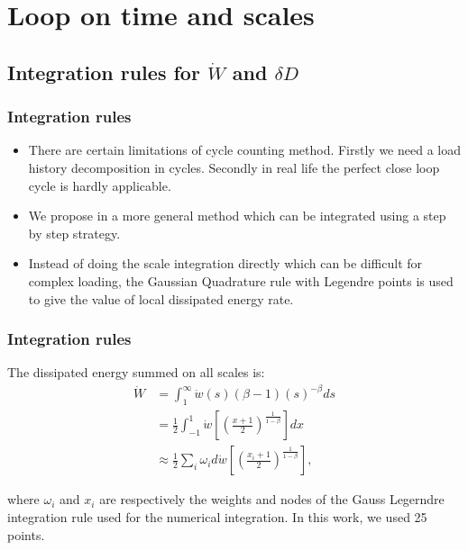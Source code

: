\documentclass[xcolor=table]{Bredelebeamer}
\begin{document}
\section{Loop on time and scales}
\subsection{Integration rules for $\dot{W}$ and $\delta D$}

\begin{frame}
\frametitle{Integration rules}
	\begin{block}{}	
\begin{itemize}
\item There are certain limitations of cycle counting method. Firstly we need a load history decomposition in cycles. Secondly in real life the perfect close loop cycle is hardly applicable.
					
\vspace{6pt}
\item We propose in a more general method which can be integrated using a step by step strategy. 
					
\vspace{6pt}
\item Instead of doing the scale integration directly which can be difficult for complex loading, the Gaussian Quadrature rule with Legendre points is used to give the value of local dissipated energy rate.
\end{itemize}	
\end{block}
\end{frame}	

\begin{frame}
	\frametitle{Integration rules}
The dissipated energy summed on all scales is:
\begin{equation}
	\begin{split}
		\dot{W}&=\int_{1}^{\infty}\dot{w}(s) (\beta-1)(s)^{-\beta}ds
			\\&=\frac{1}{2}\int_{-1}^{1}\dot{w}\left[  \left( \frac{x+1}{2}\right) ^{\frac{1}{1-\beta}}\right] dx
			\\&\approx\frac{1}{2}\sum_{i}\omega_id\dot{w}\left[  \left( \frac{x_i+1}{2}\right) ^{\frac{1}{1-\beta}}\right],
	\end{split}
	\label{allscale}
\end{equation}

\vspace{6pt}
where $\omega_i$ and $x_i$ are respectively the weights and nodes of the Gauss Legerndre integration rule used for the numerical integration. In this work, we used 25 points.
\end{frame}
\end{document}
